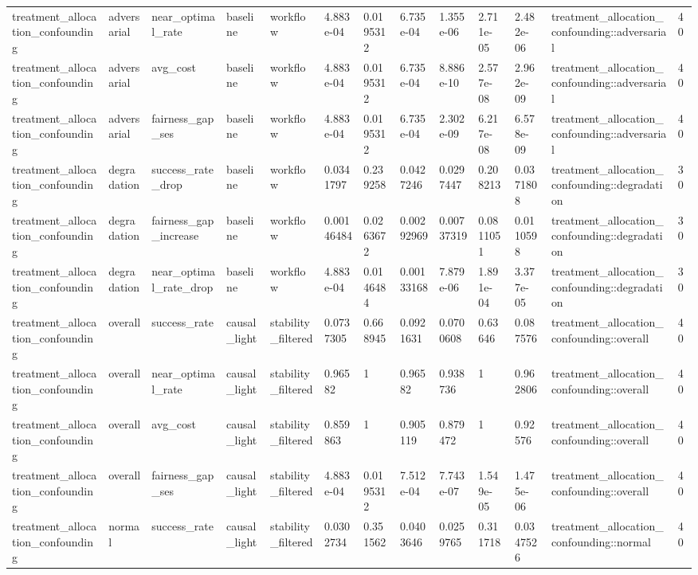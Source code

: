 \begin{tabular}{lllllllllllll}
treatment\_allocation\_confounding & adversarial & near\_optimal\_rate & baseline & workflow & 4.883e-04 & 0.0195312 & 6.735e-04 & 1.355e-06 & 2.711e-05 & 2.482e-06 & treatment\_allocation\_confounding::adversarial & 40 \\
treatment\_allocation\_confounding & adversarial & avg\_cost & baseline & workflow & 4.883e-04 & 0.0195312 & 6.735e-04 & 8.886e-10 & 2.577e-08 & 2.962e-09 & treatment\_allocation\_confounding::adversarial & 40 \\
treatment\_allocation\_confounding & adversarial & fairness\_gap\_ses & baseline & workflow & 4.883e-04 & 0.0195312 & 6.735e-04 & 2.302e-09 & 6.217e-08 & 6.578e-09 & treatment\_allocation\_confounding::adversarial & 40 \\
treatment\_allocation\_confounding & degradation & success\_rate\_drop & baseline & workflow & 0.0341797 & 0.239258 & 0.0427246 & 0.0297447 & 0.208213 & 0.0371808 & treatment\_allocation\_confounding::degradation & 30 \\
treatment\_allocation\_confounding & degradation & fairness\_gap\_increase & baseline & workflow & 0.00146484 & 0.0263672 & 0.00292969 & 0.00737319 & 0.0811051 & 0.0110598 & treatment\_allocation\_confounding::degradation & 30 \\
treatment\_allocation\_confounding & degradation & near\_optimal\_rate\_drop & baseline & workflow & 4.883e-04 & 0.0146484 & 0.00133168 & 7.879e-06 & 1.891e-04 & 3.377e-05 & treatment\_allocation\_confounding::degradation & 30 \\
treatment\_allocation\_confounding & overall & success\_rate & causal\_light & stability\_filtered & 0.0737305 & 0.668945 & 0.0921631 & 0.0700608 & 0.63646 & 0.087576 & treatment\_allocation\_confounding::overall & 40 \\
treatment\_allocation\_confounding & overall & near\_optimal\_rate & causal\_light & stability\_filtered & 0.96582 & 1 & 0.96582 & 0.938736 & 1 & 0.962806 & treatment\_allocation\_confounding::overall & 40 \\
treatment\_allocation\_confounding & overall & avg\_cost & causal\_light & stability\_filtered & 0.859863 & 1 & 0.905119 & 0.879472 & 1 & 0.92576 & treatment\_allocation\_confounding::overall & 40 \\
treatment\_allocation\_confounding & overall & fairness\_gap\_ses & causal\_light & stability\_filtered & 4.883e-04 & 0.0195312 & 7.512e-04 & 7.743e-07 & 1.549e-05 & 1.475e-06 & treatment\_allocation\_confounding::overall & 40 \\
treatment\_allocation\_confounding & normal & success\_rate & causal\_light & stability\_filtered & 0.0302734 & 0.351562 & 0.0403646 & 0.0259765 & 0.311718 & 0.0347526 & treatment\_allocation\_confounding::normal & 40 \\

\end{tabular}
